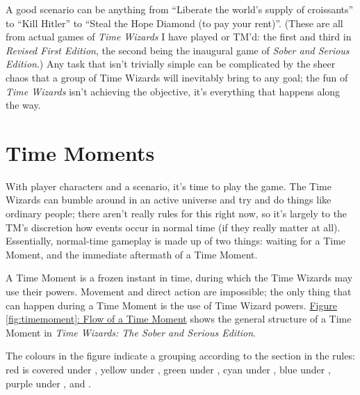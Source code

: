 \documentclass[twoside]{article}
\newcommand{\twsse}{\emph{Time Wizards: The Sober and Serious Edition}}
\newcommand{\tw}{\emph{Time Wizards}}
\newcommand{\sse}{\emph{Sober and Serious Edition}}
\newcommand{\rfe}{\emph{Revised First Edition}}
\begin{document}
A good scenario can be anything from ``Liberate the world's supply of croissants'' to ``Kill
Hitler'' to ``Steal the Hope Diamond (to pay your rent)''. (These are all from actual games of
\tw{} I have played or TM'd: the first and third in \rfe{}, the second being the inaugural game
of \sse{}.) Any task that isn't trivially simple can be complicated by the sheer chaos that a
group of Time Wizards will inevitably bring to any goal; the fun of \tw{} isn't achieving the
objective, it's everything that happens along the way.

\section{Time Moments} \label{sec:time-moment}
With player characters and a scenario, it's time to play the game. The Time Wizards can bumble
around in an active universe and try and do things like ordinary people; there aren't really
rules for this right now, so it's largely to the TM's discretion how events occur in normal time
(if they really matter at all). Essentially, normal-time gameplay is made up of two things:
waiting for a Time Moment, and the immediate aftermath of a Time Moment.

A Time Moment is a frozen instant in time, during which the Time Wizards may use their powers.
Movement and direct action are impossible; the only thing that can happen during a Time Moment
is the use of Time Wizard powers. \hyperref[fig:timemoment]{Figure \ref*{fig:timemoment}: Flow
of a Time Moment} shows the general structure of a Time Moment in \twsse{}.

The colours in the figure indicate a grouping according to the section in the rules: red is
covered under , yellow under , green
under , cyan under , blue under
, purple under , and
.
\end{document}
